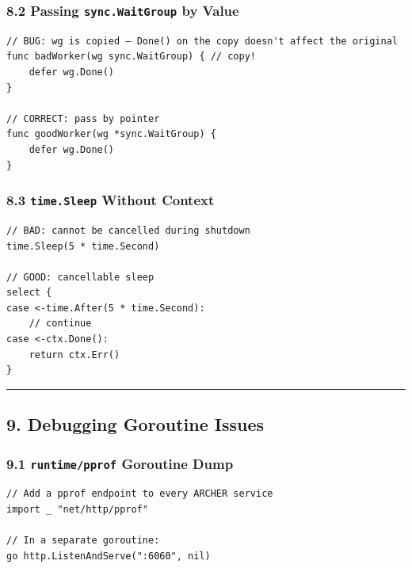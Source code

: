 \documentclass[11pt,a4paper,oneside]{book}
\begin{document}
\subsubsection{\texorpdfstring{8.2 Passing \texttt{sync.WaitGroup} by
Value}{8.2 Passing sync.WaitGroup by Value}}

\begin{verbatim}
// BUG: wg is copied — Done() on the copy doesn't affect the original
func badWorker(wg sync.WaitGroup) { // copy!
    defer wg.Done()
}

// CORRECT: pass by pointer
func goodWorker(wg *sync.WaitGroup) {
    defer wg.Done()
}
\end{verbatim}

\subsubsection{\texorpdfstring{8.3 \texttt{time.Sleep} Without
Context}{8.3 time.Sleep Without Context}}

\begin{verbatim}
// BAD: cannot be cancelled during shutdown
time.Sleep(5 * time.Second)

// GOOD: cancellable sleep
select {
case <-time.After(5 * time.Second):
    // continue
case <-ctx.Done():
    return ctx.Err()
}
\end{verbatim}

\begin{center}\rule{0.5\linewidth}{0.5pt}\end{center}

\subsection{9. Debugging Goroutine
Issues}

\subsubsection{\texorpdfstring{9.1 \texttt{runtime/pprof} Goroutine
Dump}{9.1 runtime/pprof Goroutine Dump}}

\begin{verbatim}
// Add a pprof endpoint to every ARCHER service
import _ "net/http/pprof"

// In a separate goroutine:
go http.ListenAndServe(":6060", nil)
\end{verbatim}
\end{document}
